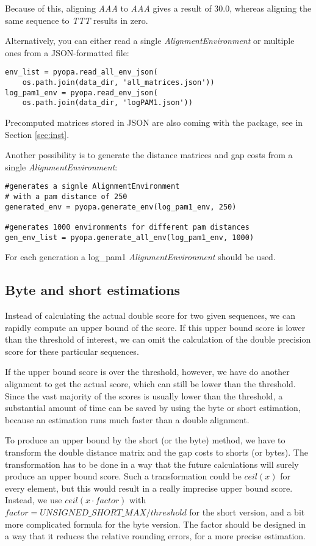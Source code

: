 \documentclass[12pt]{article}
\newcommand{\alenv}{\emph{AlignmentEnvironment}}
\begin{document}
Because of this, aligning \emph{AAA} to \emph{AAA} gives a result of 30.0, whereas aligning the same sequence to \emph{TTT} results in zero.


Alternatively, you can either read a single \alenv{} or multiple ones from a JSON-formatted file:
\begin{lstlisting}
env_list = pyopa.read_all_env_json(
    os.path.join(data_dir, 'all_matrices.json'))
log_pam1_env = pyopa.read_env_json(
    os.path.join(data_dir, 'logPAM1.json'))
\end{lstlisting}

Precomputed matrices stored in JSON are also coming with the package, see in Section \ref{sec:inst}.

Another possibility is to generate the distance matrices and gap costs from a single \alenv{}:

\begin{lstlisting}
#generates a signle AlignmentEnvironment
# with a pam distance of 250
generated_env = pyopa.generate_env(log_pam1_env, 250)

#generates 1000 environments for different pam distances
gen_env_list = pyopa.generate_all_env(log_pam1_env, 1000)
\end{lstlisting}

For each generation a log\_pam1 \alenv{} should be used.

\subsection{Byte and short estimations}
\label{subsec:bsEstim}
Instead of calculating the actual double score for two given sequences, we can rapidly compute an upper bound of the score. If this upper bound score is lower than the threshold of interest, we can omit the calculation of the double precision score for these particular sequences.

If the upper bound score is over the threshold, however, we have do another alignment to get the actual
 score, which can still be lower than the threshold. Since the vast majority of the scores is usually lower than the threshold, a substantial amount of time can be saved by using the byte or short estimation, because an estimation runs much faster than a double alignment.

To produce an upper bound by the short (or the byte) method, we have to transform the double distance matrix and the gap costs to shorts (or bytes). The transformation has to be done in a way that the future calculations will surely produce an upper bound score. Such a transformation could be $ceil(x)$ for every element, but this would result in a really imprecise upper bound score. Instead, we use $ceil(x \cdot factor)$ with $factor=UNSIGNED\_SHORT\_MAX / threshold$ for the short version, and a bit more complicated formula for the byte version. The factor should be designed in a way that it reduces the relative rounding errors, for a more precise estimation.
\end{document}
